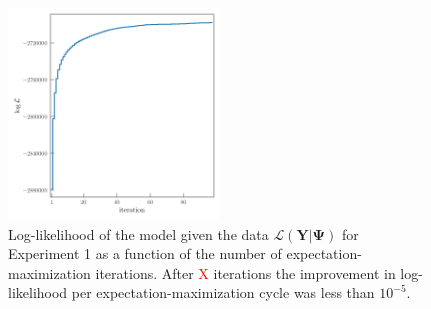 \documentclass[twocolumn]{aastex61}
\newcommand{\todo}[1]{\textcolor{red}{#1}}
\newcommand{\vect}[1]{\boldsymbol{\mathbf{#1}}}
\renewcommand{\vec}[1]{\vect{#1}}
\newcommand{\data}{\textbf{Y}}
\newcommand{\NumLatentFactors}{J}
\newcommand{\NumComponents}{K}
\begin{document}




\begin{figure}
	\includegraphics[width=0.5\textwidth]{experiments/exp1-ll-iterations.png}
	\caption{Log-likelihood of the model given the data $\mathcal{L}\left(\vec\data|\vec\Psi\right)$ for Experiment 1 as a function of the number of expectation-maximization iterations. After \todo{X} iterations the improvement in log-likelihood per
    expectation-maximization cycle was less than $10^{-5}$.}
    \label{fig:exp1-ll-iterations}
\end{figure}
\end{document}
